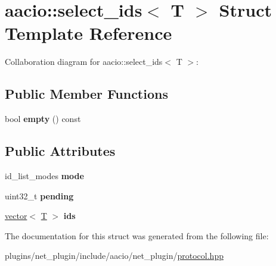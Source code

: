 \hypertarget{structaacio_1_1select__ids}{}\section{aacio\+:\+:select\+\_\+ids$<$ T $>$ Struct Template Reference}
\label{structaacio_1_1select__ids}


Collaboration diagram for aacio\+:\+:select\+\_\+ids$<$ T $>$\+:
\subsection*{Public Member Functions}
\begin{DoxyCompactItemize}
\item 
\mbox{\label{structaacio_1_1select__ids_aed43850048c22ad4fda516fababa8438}} 
bool {\bfseries empty} () const
\end{DoxyCompactItemize}
\subsection*{Public Attributes}
\begin{DoxyCompactItemize}
\item 
\mbox{\label{structaacio_1_1select__ids_af124a72c84f7d4e3034dcead2a242141}} 
id\+\_\+list\+\_\+modes {\bfseries mode}
\item 
\mbox{\label{structaacio_1_1select__ids_a3bed97e9944d57c6e0c2f86560028491}} 
uint32\+\_\+t {\bfseries pending}
\item 
\mbox{\label{structaacio_1_1select__ids_a0e0a3fb913c50025994e4952dab9b99b}} 
\mbox{\hyperlink{classstd_1_1vector}{vector}}$<$ \mbox{\hyperlink{struct_t}{T}} $>$ {\bfseries ids}
\end{DoxyCompactItemize}


The documentation for this struct was generated from the following file\+:\begin{DoxyCompactItemize}
\item 
plugins/net\+\_\+plugin/include/aacio/net\+\_\+plugin/\mbox{\hyperlink{plugins_2net__plugin_2include_2aacio_2net__plugin_2protocol_8hpp}{protocol.\+hpp}}\end{DoxyCompactItemize}
